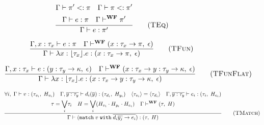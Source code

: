 \begin{figure}[H]
    \begin{multicols}{2}
        \begin{equation}
            \frac{
                \begin{gathered}
                    \Gamma \vdash \pi' <: \pi \quad \Gamma \vdash \pi <: \pi' \\
                    \Gamma \vdash e: \pi \quad \Gamma \vdash^{\textbf{WF}} \pi'
                \end{gathered}
            }{
                \Gamma \vdash e: \pi'
            }
            \tag{\textsc{TEq}}
            \label{eq:teq}
        \end{equation}

        \columnbreak

        \begin{equation}
            \frac{
                \Gamma, x: \tau_x \vdash e: \pi \quad \Gamma \vdash^{\textbf{WF}} (x: \tau_x \rightarrow \pi, \; \epsilon)
            }{
                \Gamma \vdash \lambda x : \lfloor\tau_x\rfloor. e : (x: \tau_x \rightarrow \pi, \; \epsilon)
            }
            \tag{\textsc{TFun}}
            \label{eq:tfun}
        \end{equation}
    \end{multicols}

    \begin{equation}
        \frac{
            \Gamma, x: \tau_x \vdash e: (y: \tau_y \rightarrow \kappa, \; \epsilon) \quad \Gamma \vdash^{\textbf{WF}} (x: \tau_x \rightarrow y: \tau_y \rightarrow \kappa, \; \epsilon)
        }{
            \Gamma \vdash \lambda x : \lfloor\tau_x\rfloor. e : (x: \tau_x \rightarrow y: \tau_y \rightarrow \kappa, \; \epsilon)
        }
        \tag{\textsc{TFunFlat}}
        \label{eq:tflat}
    \end{equation}    

    \begin{equation}
        \frac{
            \begin{gathered}
                \forall i, \;\Gamma \vdash v: (\tau_{v_i}, \; H_{v_i}) \quad \Gamma, \overline{y: \tau_y} \vdash d_i(\overline{y}) : (\tau_{d_i}, \;H_{y_i}) \quad \langle \tau_{v_i} \rangle = \langle \tau_{d_i} \rangle \quad \Gamma, \overline{y: \tau_y} \vdash e_i: (\tau_i, \;H_{e_i}) \\
                \tau = \underset{i}{\bigvee} \tau_i \quad H = \underset{i}{\bigvee} (H_{v_i} \cdot H_{y_i} \cdot H_{e_i}) \quad \Gamma \vdash^{\textbf{WF}} (\tau, \;H)   
            \end{gathered}
        }{
            \Gamma \vdash (\texttt{match}\;v\;\texttt{with}\;\overline{d_i\overline{y_j} \rightarrow e_i}): (\tau, \;H)
        }
        \tag{\textsc{TMatch}}
        \label{eq:tmatch}
    \end{equation}


\end{figure}
